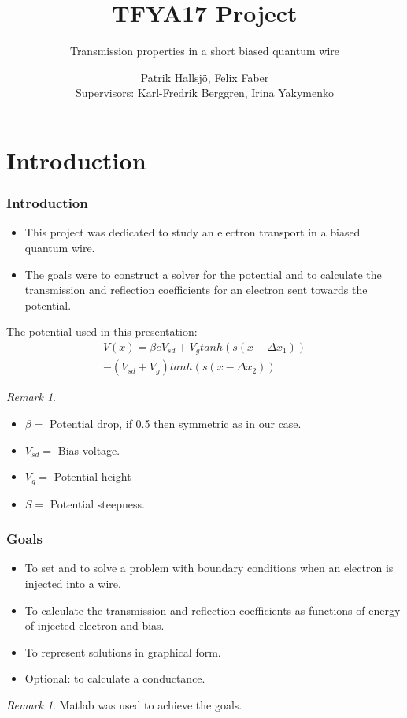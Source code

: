 \documentclass[•]{beamer}
\subtitle{Transmission properties in a short biased quantum wire}
\title{TFYA17 Project}
\author{Patrik Hallsj\"{o}, Felix Faber \\ Supervisors: Karl-Fredrik Berggren, Irina Yakymenko}
\date{}
\theoremstyle{remark}
\newtheorem{remark}[theorem]{Remark}
\begin{document}
\begin{frame}
\titlepage
\end{frame}
\begin{frame}
\tableofcontents
\end{frame}
\section{Introduction}
\begin{frame}[shrink=10]\frametitle{Introduction}
\begin{block}

\begin{itemize}
\item This project was dedicated to study an electron transport in a biased quantum wire.
\item The goals were to construct a solver for the potential and to calculate the transmission and reflection coefficients for an electron sent towards the potential.
\end{itemize}
\end{block}
\end{frame}

\begin{frame}
\begin{block}

The potential used in this presentation:
\begin{eqnarray*}
\label{potential}
V(x) = \beta e V_{sd}+V_{g}tanh(s(x-\Delta x_{1}))\\
-(V_{sd}+V_{g})tanh(s(x-\Delta x_{2}))
\end{eqnarray*}
\end{block}
\begin{remark}
\begin{itemize}
\item $\beta=$ Potential drop, if 0.5 then symmetric as in our case.
\item $V_{sd} =$ Bias voltage.
\item $V_g =$ Potential height
\item $S=$ Potential steepness.
\end{itemize}
\end{remark}
\end{frame}
\begin{frame}\frametitle{Goals}
\begin{block}

\begin{itemize}
\item To set and to solve a problem with boundary conditions when an electron is injected into a wire.
\pause
\item To calculate the transmission and reflection coefficients as functions of energy of injected electron and bias.
\pause
\item To represent solutions in graphical form.
\pause
\item Optional: to calculate a conductance.
\end{itemize}
\end{block}
\pause
\begin{remark}
Matlab was used to achieve the goals.
\end{remark}
\end{frame}
\end{document}
